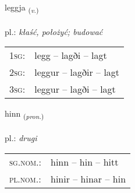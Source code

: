 \documentclass[frontgrid, backgrid]{flacards}\usepackage[]{graphicx}\usepackage[]{xcolor}
\begin{document}
{leggja \small{\textsubscript{(\textit{v.})}} \\[1ex] %
\textphonetic{[lɛca]} \\
pl.: \emph{kłaść, położyć; budować} \\  [2ex]
\renewcommand*{\arraystretch}{0.8}
\begin{tabular}{p{1cm}l}
\textsc{1sg}: & legg -- lagði -- lagt \\ 
\textsc{2sg}: & leggur -- lagðir -- lagt \\ 
\textsc{3sg}: & leggur -- lagði -- lagt \\ 
\end{tabular}
}

\renewcommand{\flhead}{\vskip5pt \fboxsep=0pt {\small\bfseries\footnotesize Fornafn | Pronoun}}
\renewcommand{\fcfoot}{\vskip5pt \fboxsep=0pt \hspace{2pt}{\small\bfseries\footnotesize 1K}}

\renewcommand{\blhead}{\vskip5pt {\small\bfseries\footnotesize Fornafn | Pronoun }}
\renewcommand{\bcfoot}{\vskip5pt \hspace{2pt}{\small\bfseries\footnotesize 1K}}


{hinn \small{\textsubscript{(\textit{pron.})}} \\[1ex] %
\textphonetic{[hɪn]} \\
pl.: \emph{drugi} \\  [2ex]
\renewcommand*{\arraystretch}{0.8}
\begin{tabular}{ll}
\textsc{sg.nom.}: & hinn  --  hin -- hitt \\ 
\textsc{pl.nom.}: & hinir -- hinar -- hin
\end{tabular}
}

\renewcommand{\flhead}{\vskip5pt \fboxsep=0pt {\small\bfseries\footnotesize Nafnorð | Noun}}
\renewcommand{\fcfoot}{\vskip5pt \fboxsep=0pt \hspace{2pt}{\small\bfseries\footnotesize 1K}}

\renewcommand{\blhead}{\vskip5pt {\small\bfseries\footnotesize Nafnorð | Noun }}
\renewcommand{\bcfoot}{\vskip5pt \hspace{2pt}{\small\bfseries\footnotesize 1K}}
\end{document}
